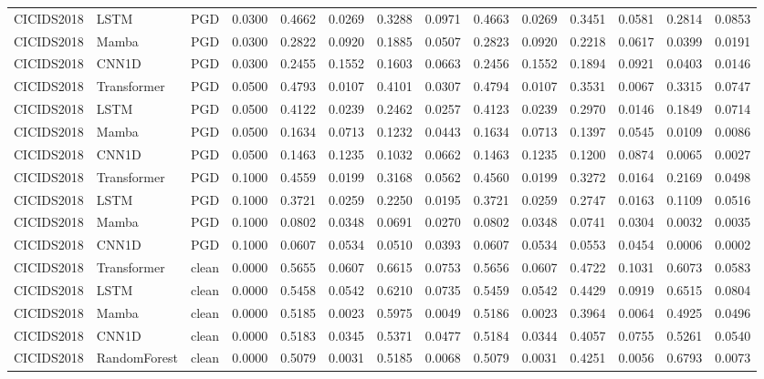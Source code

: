 \begin{table}[ht]
\begin{tabular}{lllrrrrrrrrrrr}
CICIDS2018 & LSTM & PGD & 0.0300 & 0.4662 & 0.0269 & 0.3288 & 0.0971 & 0.4663 & 0.0269 & 0.3451 & 0.0581 & 0.2814 & 0.0853 \\
CICIDS2018 & Mamba & PGD & 0.0300 & 0.2822 & 0.0920 & 0.1885 & 0.0507 & 0.2823 & 0.0920 & 0.2218 & 0.0617 & 0.0399 & 0.0191 \\
CICIDS2018 & CNN1D & PGD & 0.0300 & 0.2455 & 0.1552 & 0.1603 & 0.0663 & 0.2456 & 0.1552 & 0.1894 & 0.0921 & 0.0403 & 0.0146 \\
CICIDS2018 & Transformer & PGD & 0.0500 & 0.4793 & 0.0107 & 0.4101 & 0.0307 & 0.4794 & 0.0107 & 0.3531 & 0.0067 & 0.3315 & 0.0747 \\
CICIDS2018 & LSTM & PGD & 0.0500 & 0.4122 & 0.0239 & 0.2462 & 0.0257 & 0.4123 & 0.0239 & 0.2970 & 0.0146 & 0.1849 & 0.0714 \\
CICIDS2018 & Mamba & PGD & 0.0500 & 0.1634 & 0.0713 & 0.1232 & 0.0443 & 0.1634 & 0.0713 & 0.1397 & 0.0545 & 0.0109 & 0.0086 \\
CICIDS2018 & CNN1D & PGD & 0.0500 & 0.1463 & 0.1235 & 0.1032 & 0.0662 & 0.1463 & 0.1235 & 0.1200 & 0.0874 & 0.0065 & 0.0027 \\
CICIDS2018 & Transformer & PGD & 0.1000 & 0.4559 & 0.0199 & 0.3168 & 0.0562 & 0.4560 & 0.0199 & 0.3272 & 0.0164 & 0.2169 & 0.0498 \\
CICIDS2018 & LSTM & PGD & 0.1000 & 0.3721 & 0.0259 & 0.2250 & 0.0195 & 0.3721 & 0.0259 & 0.2747 & 0.0163 & 0.1109 & 0.0516 \\
CICIDS2018 & Mamba & PGD & 0.1000 & 0.0802 & 0.0348 & 0.0691 & 0.0270 & 0.0802 & 0.0348 & 0.0741 & 0.0304 & 0.0032 & 0.0035 \\
CICIDS2018 & CNN1D & PGD & 0.1000 & 0.0607 & 0.0534 & 0.0510 & 0.0393 & 0.0607 & 0.0534 & 0.0553 & 0.0454 & 0.0006 & 0.0002 \\
CICIDS2018 & Transformer & clean & 0.0000 & 0.5655 & 0.0607 & 0.6615 & 0.0753 & 0.5656 & 0.0607 & 0.4722 & 0.1031 & 0.6073 & 0.0583 \\
CICIDS2018 & LSTM & clean & 0.0000 & 0.5458 & 0.0542 & 0.6210 & 0.0735 & 0.5459 & 0.0542 & 0.4429 & 0.0919 & 0.6515 & 0.0804 \\
CICIDS2018 & Mamba & clean & 0.0000 & 0.5185 & 0.0023 & 0.5975 & 0.0049 & 0.5186 & 0.0023 & 0.3964 & 0.0064 & 0.4925 & 0.0496 \\
CICIDS2018 & CNN1D & clean & 0.0000 & 0.5183 & 0.0345 & 0.5371 & 0.0477 & 0.5184 & 0.0344 & 0.4057 & 0.0755 & 0.5261 & 0.0540 \\
CICIDS2018 & RandomForest & clean & 0.0000 & 0.5079 & 0.0031 & 0.5185 & 0.0068 & 0.5079 & 0.0031 & 0.4251 & 0.0056 & 0.6793 & 0.0073 \\

\end{tabular}
\end{table}
